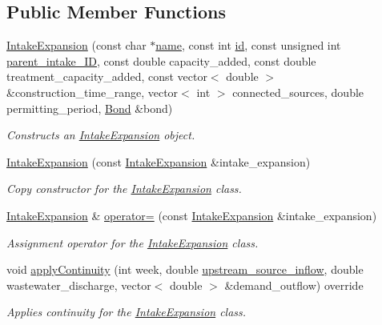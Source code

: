 \subsection*{Public Member Functions}
\begin{DoxyCompactItemize}
\item 
\mbox{\hyperlink{classIntakeExpansion_abf871880367036c599caab901eb46339}{Intake\+Expansion}} (const char $\ast$\mbox{\hyperlink{classWaterSource_a846ea74c5b453d014f594d41fee8c765}{name}}, const int \mbox{\hyperlink{classWaterSource_a6eafe5dfefd317877d1244e8a7c6e742}{id}}, const unsigned int \mbox{\hyperlink{classIntakeExpansion_a93569405968a66226046e730e691615c}{parent\+\_\+intake\+\_\+\+ID}}, const double capacity\+\_\+added, const double treatment\+\_\+capacity\+\_\+added, const vector$<$ double $>$ \&construction\+\_\+time\+\_\+range, vector$<$ int $>$ connected\+\_\+sources, double permitting\+\_\+period, \mbox{\hyperlink{classBond}{Bond}} \&bond)
\begin{DoxyCompactList}\small\item\em Constructs an \mbox{\hyperlink{classIntakeExpansion}{Intake\+Expansion}} object. \end{DoxyCompactList}\item 
\mbox{\hyperlink{classIntakeExpansion_a88a12d71e8c3bcba51de9f21636f866f}{Intake\+Expansion}} (const \mbox{\hyperlink{classIntakeExpansion}{Intake\+Expansion}} \&intake\+\_\+expansion)
\begin{DoxyCompactList}\small\item\em Copy constructor for the \mbox{\hyperlink{classIntakeExpansion}{Intake\+Expansion}} class. \end{DoxyCompactList}\item 
\mbox{\hyperlink{classIntakeExpansion}{Intake\+Expansion}} \& \mbox{\hyperlink{classIntakeExpansion_a554bef7ab4c9216147baa9df5c35d17e}{operator=}} (const \mbox{\hyperlink{classIntakeExpansion}{Intake\+Expansion}} \&intake\+\_\+expansion)
\begin{DoxyCompactList}\small\item\em Assignment operator for the \mbox{\hyperlink{classIntakeExpansion}{Intake\+Expansion}} class. \end{DoxyCompactList}\item 
void \mbox{\hyperlink{classIntakeExpansion_a8686b58c65444182ba19b783fc6ff77f}{apply\+Continuity}} (int week, double \mbox{\hyperlink{classWaterSource_a7a69b2e9b6030f1035e6cf44d2918ee5}{upstream\+\_\+source\+\_\+inflow}}, double wastewater\+\_\+discharge, vector$<$ double $>$ \&demand\+\_\+outflow) override
\begin{DoxyCompactList}\small\item\em Applies continuity for the \mbox{\hyperlink{classIntakeExpansion}{Intake\+Expansion}} class. \end{DoxyCompactList}\end{DoxyCompactItemize}

